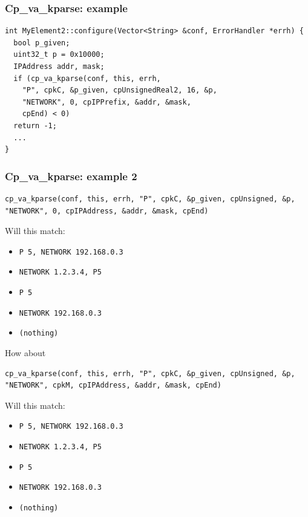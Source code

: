 \documentclass{beamer}
\begin{document}
\begin{frame}[fragile]
\frametitle{Cp\_va\_kparse: example}
\begin{lstlisting}
int MyElement2::configure(Vector<String> &conf, ErrorHandler *errh) {
  bool p_given;
  uint32_t p = 0x10000;
  IPAddress addr, mask;
  if (cp_va_kparse(conf, this, errh,
    "P", cpkC, &p_given, cpUnsignedReal2, 16, &p,
    "NETWORK", 0, cpIPPrefix, &addr, &mask,
    cpEnd) < 0)
  return -1;
  ...
}
\end{lstlisting}
\end{frame}

\begin{frame}
\frametitle{Cp\_va\_kparse: example 2}
\begin{lstlisting}
cp_va_kparse(conf, this, errh, "P", cpkC, &p_given, cpUnsigned, &p, "NETWORK", 0, cpIPAddress, &addr, &mask, cpEnd)
\end{lstlisting}
Will this match:
\begin{itemize}
	\item \lstinline!P 5, NETWORK 192.168.0.3!
	\item \lstinline!NETWORK 1.2.3.4, P5     !
	\item \lstinline!P 5                     !
	\item \lstinline!NETWORK 192.168.0.3     !
	\item \lstinline!(nothing)               !
\end{itemize}
\framebreak
How about
\begin{lstlisting}
cp_va_kparse(conf, this, errh, "P", cpkC, &p_given, cpUnsigned, &p, "NETWORK", cpkM, cpIPAddress, &addr, &mask, cpEnd)
\end{lstlisting}
Will this match:
\begin{itemize}
	\item \lstinline!P 5, NETWORK 192.168.0.3!
	\item \lstinline!NETWORK 1.2.3.4, P5     !
	\item \lstinline!P 5                     !
	\item \lstinline!NETWORK 192.168.0.3     !
	\item \lstinline!(nothing)               !
\end{itemize}
\end{frame}
\end{document}
